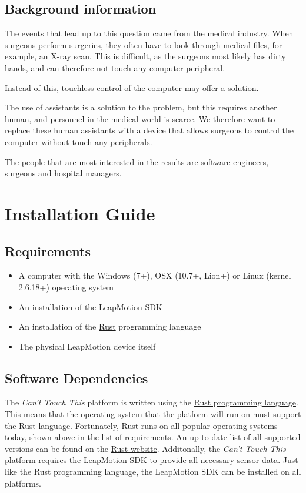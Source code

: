 \documentclass[a4paper]{article}
\providecommand{\tightlist}{%
\setlength{\itemsep}{0pt}\setlength{\parskip}{0pt}}
\begin{document}
  \subsection{Background information}
  The events that lead up to this question came from the medical industry. When
  surgeons perform surgeries, they often have to look through medical files, for
  example, an X-ray scan. This is difficult, as the surgeons most likely has
  dirty hands, and can therefore not touch any computer peripheral.
  
  
  Instead of this, touchless control of the computer may offer a solution.

  The use of assistants is a solution to the problem, but this requires another
  human, and personnel in the medical world is scarce. We therefore want to
  replace these human assistants with a device that allows surgeons to control
  the computer without touch any peripherals.

  The people that are most interested in the results are software engineers,
  surgeons and hospital managers.
  \clearpage

  \section{Installation Guide}
  \subsection{Requirements}
  \begin{itemize}
    \tightlist
    \item A computer with the Windows (7+), OSX (10.7+, Lion+) or
      Linux (kernel 2.6.18+) operating system
    \item An installation of the LeapMotion
      \href{https://developer.leapmotion.com/sdk/v2}{SDK}
    \item An installation of the
      \href{https://rust-lang.org}{Rust} programming language
    \item The physical LeapMotion device itself
  \end{itemize}

  \subsection{Software Dependencies}
  The \textit{Can't Touch This} platform is written using the
  \href{https://rust-lang.org}{Rust programming language}. This means that the
  operating system that the platform will run on must support the Rust language.
  Fortunately, Rust runs on all popular operating systems today, shown above in
  the list of requirements. An up-to-date list of all supported versions can be
  found on the
  \href{https://forge.rust-lang.org/platform-support.html}{Rust website}.
  Additonally, the \textit{Can't Touch This} platform requires the LeapMotion
  \href{https://developer.leapmotion.com/sdk/v2}{SDK} to provide all necessary
  sensor data. Just like the Rust programming language, the LeapMotion SDK can
  be installed on all platforms.
\end{document}
